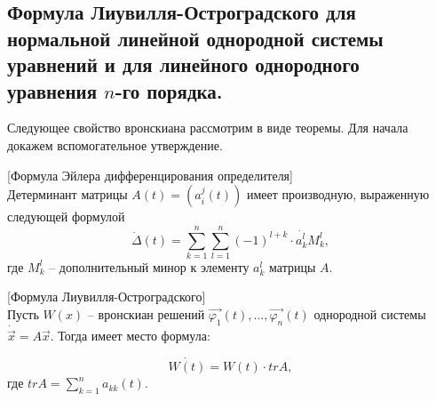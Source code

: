 \subsection{Формула Лиувилля-Остроградского для нормальной линейной однородной системы уравнений и для линейного однородного уравнения $n$-го порядка.}

Следующее свойство вронскиана рассмотрим в виде теоремы. Для начала докажем вспомогательное утверждение.

\begin{lemma}

[Формула Эйлера дифференцирования определителя]\\
Детерминант матрицы $A(t) = (a_i^j(t))$ имеет производную, выраженную следующей формулой
\[\dot{\Delta}(t) = \sum\limits_{k = 1}^n{\sum\limits_{l = 1}^n{(-1)^{l + k} \cdot \dot{a_k^l}}M_k^l},\]
где $M_k^l$ -- дополнительный минор к элементу $a_k^l$ матрицы $A$.

\end{lemma}

\begin{theorem}

[Формула Лиувилля-Остроградского]\\
Пусть $W(x)$ -- вронскиан решений $\overrightarrow{\varphi_1}(t), ..., \overrightarrow{\varphi_n}(t)$ однородной системы $\dot{\overrightarrow{x}} = A\overrightarrow{x}$. Тогда имеет место формула:

\[\dot{W(t)} = W(t) \cdot trA,\]
где $trA = \sum\limits_{k = 1}^n{a_{kk}(t)}$.

\end{theorem}

